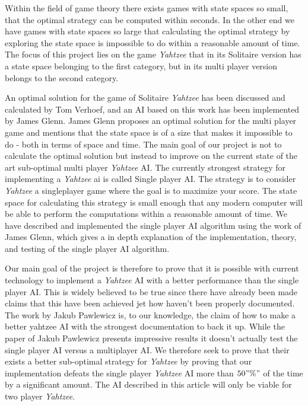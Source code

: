 Within the field of game theory there exists games with state spaces so small, that the optimal strategy can be computed within seconds. 
In the other end we have games with state spaces so large that calculating the optimal strategy by exploring the state space is impossible to do within a reasonable amount of time. 
The focus of this project lies on the game \emph{Yahtzee} that in its Solitaire version has a state space belonging to the first category, but in its multi player version belongs to the second category.

An optimal solution for the game of Solitaire \emph{Yahtzee} has been discussed and calculated by Tom Verhoef, and an AI based on this work has been implemented by James Glenn.
James Glenn proposes an optimal solution for the multi player game and mentions that the state space is of a size that makes it impossible to do - both in terms of space and time.
The main goal of our project is not to calculate the optimal solution but instead to improve on the current state of the art sub-optimal multi player \emph{Yahtzee} AI. 
The currently strongest strategy for implementing a \emph{Yahtzee} ai is called Single player AI. 
The strategy is to consider \emph{Yahtzee} a singleplayer game where the goal is to maximize your score. 
The state space for calculating this strategy is small enough that any modern computer will be able to perform the computations within a reasonable amount of time. 
We have described and implemented the single player AI algorithm using the work of James Glenn\cite{glenn2006optimal}, which gives a in depth explanation of the implementation, theory, and testing of the single player AI algorithm.

Our main goal of the project is therefore to prove that it is possible with current technology to implement a \emph{Yahtzee} AI with a better performance than the single player AI. 
This is widely believed to be true since there have already been made claims that this have been achieved jet how haven't been properly documented.
The work by Jakub Pawlewicz is, to our knowledge, the claim of how to make a better yahtzee AI with the strongest documentation to back it up. 
While the paper of Jakub Pawlewicz\citep{pawlewicz2011nearly} presents impressive results it doesn't actually test the single player AI versus a multiplayer AI.
We therefore seek to prove that their exists a better sub-optimal strategy for \emph{Yahtzee} by proving that our implementation defeats the single player \emph{Yahtzee} AI more than $50"\%" $ of the time by a significant amount. The AI described in this article will only be viable for two player \emph{Yahtzee}.


